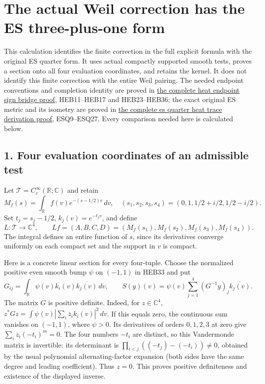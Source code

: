 \documentclass[
  10pt,
  a4paper,
]{article}
\author{}
\date{}
\begin{document}
{
\setcounter{tocdepth}{3}
\tableofcontents
}
\section{The actual Weil correction has the ES three-plus-one
form}\label{the-actual-weil-correction-has-the-es-three-plus-one-form}

This calculation identifies the finite correction in the full explicit
formula with the original ES quarter form. It uses actual compactly
supported smooth tests, proves a section onto all four evaluation
coordinates, and retains the kernel. It does not identify this finite
correction with the entire Weil pairing. The needed endpoint conventions
and completion identity are proved in
\href{https://github.com/KokunoYumeto/zeta-function-research-reader/blob/d5c9d198a8432e3ede468b280162a99c00e3f4f7/workbenches/splitzero-tandem/branches/tau-zero-prime-positivity/HEAT_ENDPOINT_SIGN_BRIDGE.md}{the
complete heat endpoint sign bridge proof}, HEB11--HEB17 and
HEB23--HEB36; the exact original ES metric and its isometry are proved
in
\href{https://github.com/KokunoYumeto/zeta-function-research-reader/blob/d5c9d198a8432e3ede468b280162a99c00e3f4f7/workbenches/splitzero-tandem/branches/tau-zero-prime-positivity/ES_QUARTER_HEAT_TRACE_DERIVATION.md}{the
complete es quarter heat trace derivation proof}, ESQ9--ESQ27. Every
comparison needed here is calculated below.

\subsection{1. Four evaluation coordinates of an admissible
test}\label{four-evaluation-coordinates-of-an-admissible-test}

Let \(\mathcal T=C_c^\infty(\mathbb R;\mathbb C)\) and retain \[
M_f(s)=\int_{\mathbb R}f(v)e^{-(s-1/2)v}\,dv,
\quad (s_1,s_2,s_3,s_4)=(0,1,1/2+i/2,1/2-i/2).
\tag{WEC1}
\] Set \(t_j=s_j-1/2\), \(k_j(v)=e^{-t_jv}\), and define \[
L:\mathcal T\longrightarrow\mathbb C^4,
\qquad Lf=(A,B,C,D)=(M_f(s_1),M_f(s_2),M_f(s_3),M_f(s_4)).
\tag{WEC2}
\] The integral defines an entire function of \(s\), since its
derivatives converge uniformly on each compact set and the support in
\(v\) is compact.

Here is a concrete linear section for every four-tuple. Choose the
normalized positive even smooth bump \(\psi\) on \((-1,1)\) in HEB33 and
put \[
G_{ij}=\int_{\mathbb R}\psi(v)k_i(v)\overline{k_j(v)}\,dv,
\qquad
S(y)(v)=\psi(v)\sum_{j=1}^4(G^{-1}y)_j\overline{k_j(v)}.
\tag{WEC3}
\] The matrix \(G\) is positive definite. Indeed, for
\(z\in\mathbb C^4\),
\(z^*Gz=\int\psi(v)|\sum_i\overline z_i k_i(v)|^2\,dv\). If this equals
zero, the continuous sum vanishes on \((-1,1)\), where \(\psi>0\). Its
derivatives of orders \(0,1,2,3\) at zero give
\(\sum_i\overline z_i(-t_i)^m=0\). The four numbers \(-t_i\) are
distinct, so this Vandermonde matrix is invertible: its determinant is
\(\prod_{i<j}((-t_j)-(-t_i))\ne0\), obtained by the usual polynomial
alternating-factor expansion (both sides have the same degree and
leading coefficient). Thus \(z=0\). This proves positive definiteness
and existence of the displayed inverse.
\end{document}
